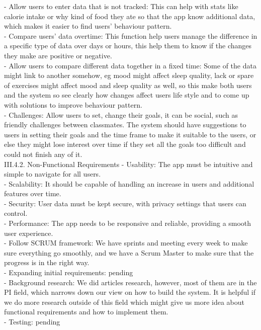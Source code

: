 \documentclass[12pt]{article}
\begin{document}
-    Allow users to enter data that is not tracked: This can help with stats like calorie intake or why kind of food they ate so that the app know additional data, which makes it easier to find users’ behaviour pattern.\\
-    Compare users’ data overtime: This function help users manage the difference in a specific type of data over days or hours, this help them to know if the changes they make are positive or negative.\\
-    Allow users to compare different data together in a fixed time: Some of the data might link to another somehow, eg mood might affect sleep quality, lack or spare of exercises might affect mood and sleep quality as well, so this make both users and the system so see clearly how changes affect users life style and to come up with solutions to improve behaviour pattern.\\
-    Challenges: Allow users to set, change their goals, it can be social, such as friendly challenges between classmates. The system should have suggestions to users in setting their goals and the time frame to make it suitable to the users, or else they might lose interest over time if they set all the goals too difficult and could not finish any of it.\\
 
III.4.2. Non-Functional Requirements
-    Usability: The app must be intuitive and simple to navigate for all users.\\
-    Scalability: It should be capable of handling an increase in users and additional features over time.\\
-    Security: User data must be kept secure, with privacy settings that users can control.\\
-    Performance: The app needs to be responsive and reliable, providing a smooth user experience.\\
-    Follow SCRUM framework: We have sprints and meeting every week to make sure everything go smoothly, and we have a Scrum Master to make sure that the progress is in the right way.\\
-    Expanding initial requirements: pending\\
-    Background research: We did articles research, however, most of them are in the PI field, which narrows down our view on how to build the system. It is helpful if we do more research outside of this field which might give us more idea about functional requirements and how to implement them.\\
-    	Testing: pending\\
\end{document}
